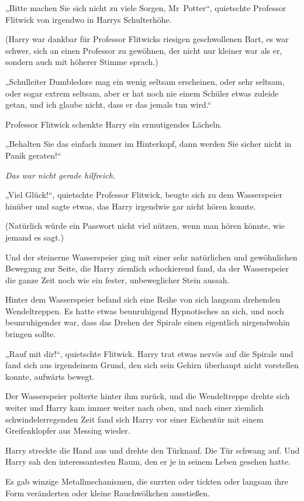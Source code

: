 {„Bitte machen Sie sich nicht zu viele Sorgen, Mr~Potter“, quietschte Professor Flitwick von irgendwo in Harrys Schulterhöhe.

(Harry war dankbar für Professor Flitwicks riesigen geschwollenen Bart, es war schwer, sich an einen Professor zu gewöhnen, der nicht nur kleiner war als er, sondern auch mit höherer Stimme sprach.)

„Schulleiter Dumbledore mag ein wenig seltsam erscheinen, oder sehr seltsam, oder sogar extrem seltsam, aber er hat noch nie einem Schüler etwas zuleide getan, und ich glaube nicht, dass er das jemals tun wird.“

Professor Flitwick schenkte Harry ein ermutigendes Lächeln.

„Behalten Sie das einfach immer im Hinterkopf, dann werden Sie sicher nicht in Panik geraten!“

\emph{Das war nicht gerade hilfreich.}

„Viel Glück!“, quietschte Professor Flitwick, beugte sich zu dem Wasserspeier hinüber und sagte etwas, das Harry irgendwie gar nicht hören konnte.

(Natürlich würde ein Passwort nicht viel nützen, wenn man hören könnte, wie jemand es sagt.)

Und der steinerne Wasserspeier ging mit einer sehr natürlichen und gewöhnlichen Bewegung zur Seite, die Harry ziemlich schockierend fand, da der Wasserspeier die ganze Zeit noch wie ein fester, unbeweglicher Stein aussah.

Hinter dem Wasserspeier befand sich eine Reihe von sich langsam drehenden Wendeltreppen. Es hatte etwas beunruhigend Hypnotisches an sich, und noch beunruhigender war, dass das Drehen der Spirale einen eigentlich nirgendwohin bringen sollte.

„Rauf mit dir!“, quietschte Flitwick. Harry trat etwas nervös auf die Spirale und fand sich aus irgendeinem Grund, den sich sein Gehirn überhaupt nicht vorstellen konnte, aufwärts bewegt.

Der Wasserspeier polterte hinter ihm zurück, und die Wendeltreppe drehte sich weiter und Harry kam immer weiter nach oben, und nach einer ziemlich schwindelerregenden Zeit fand sich Harry vor einer Eichentür mit einem Greifenklopfer aus Messing wieder.

Harry streckte die Hand aus und drehte den Türknauf. Die Tür schwang auf. Und Harry sah den interessantesten Raum, den er je in seinem Leben gesehen hatte.

Es gab winzige Metallmechanismen, die surrten oder tickten oder langsam ihre Form veränderten oder kleine Rauchwölkchen ausstießen.

}
